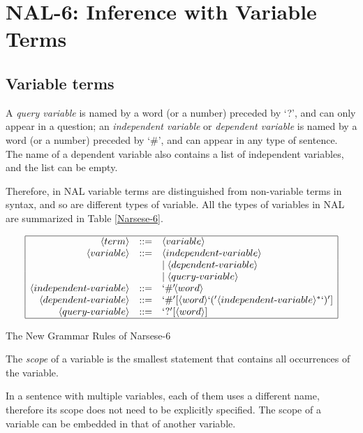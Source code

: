 
\chapter{NAL-6: Inference with Variable Terms}

\section{Variable terms}

\begin{defi}
A \emph{query variable} is named by a word (or a number) preceded by `?', and can only appear in a question; an \emph{independent variable} or \emph{dependent variable} is named by a word (or a number) preceded by `\#', and can appear in any type of sentence. The name of a dependent variable also contains a list of independent variables, and the list can be empty.
\end{defi}
Therefore, in NAL variable terms are distinguished from non-variable terms in syntax, and so are different types of variable. All the types of variables in NAL are summarized in Table \ref{Narsese-6}.

\begin{table}[htb]
\[\begin{array}{|rrl|}
\hline
\langle term \rangle  & ::= & \langle variable \rangle  \\
\langle variable \rangle  & ::= & \langle independent\mbox{-}variable \rangle \\ &&
                  		 | \; \langle dependent\mbox{-}variable \rangle \\ &&
                  		 | \; \langle query\mbox{-}variable \rangle \\
\langle independent\mbox{-}variable \rangle  & ::= & `\#'\!\langle word \rangle \\
\langle dependent\mbox{-}variable \rangle  & ::= & `\#'[\langle  word \rangle `('\langle  independent\mbox{-}variable \rangle^*`)'] \\
\langle query\mbox{-}variable \rangle  & ::= & `?'[\langle word \rangle] \\
\hline
\end{array} \]
\caption{The New Grammar Rules of Narsese-6}
\label{Narsese-6}
\end{table}

\begin{defi}
The \emph{scope} of a variable is the smallest statement that contains all occurrences of the variable.
\end{defi}
In a sentence with multiple variables, each of them uses a different name, therefore its scope does not need to be explicitly specified.  The scope of a variable can be embedded in that of another variable. 


